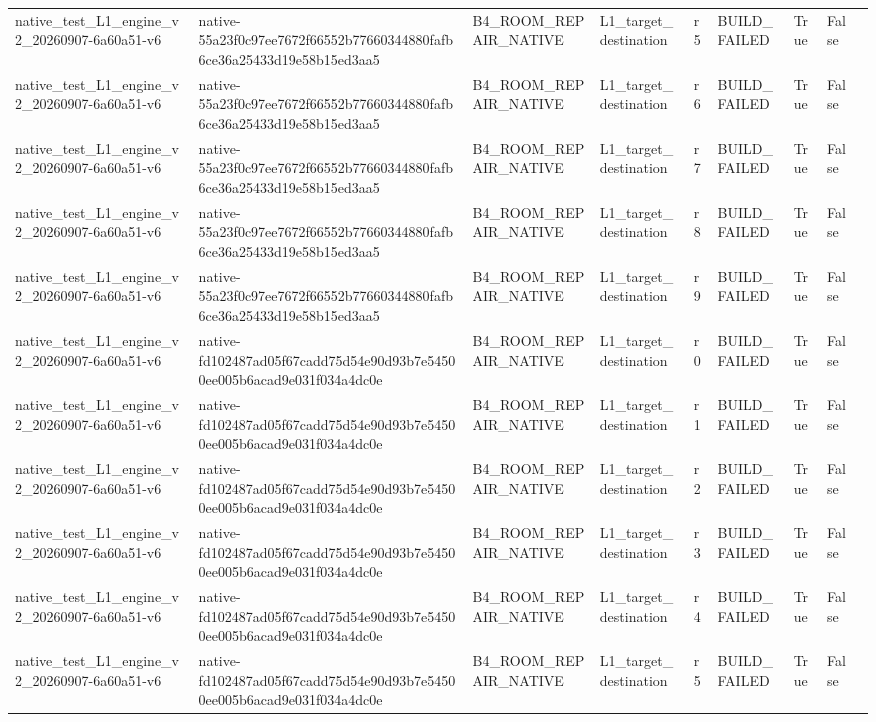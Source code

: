 \begin{tabular}{lllllllll}
native\_test\_L1\_engine\_v2\_20260907-6a60a51-v6 & native-55a23f0c97ee7672f66552b77660344880fafb6ce36a25433d19e58b15ed3aa5 & B4\_ROOM\_REPAIR\_NATIVE & L1\_target\_destination & r5 & BUILD\_FAILED & True & False &  \\
native\_test\_L1\_engine\_v2\_20260907-6a60a51-v6 & native-55a23f0c97ee7672f66552b77660344880fafb6ce36a25433d19e58b15ed3aa5 & B4\_ROOM\_REPAIR\_NATIVE & L1\_target\_destination & r6 & BUILD\_FAILED & True & False &  \\
native\_test\_L1\_engine\_v2\_20260907-6a60a51-v6 & native-55a23f0c97ee7672f66552b77660344880fafb6ce36a25433d19e58b15ed3aa5 & B4\_ROOM\_REPAIR\_NATIVE & L1\_target\_destination & r7 & BUILD\_FAILED & True & False &  \\
native\_test\_L1\_engine\_v2\_20260907-6a60a51-v6 & native-55a23f0c97ee7672f66552b77660344880fafb6ce36a25433d19e58b15ed3aa5 & B4\_ROOM\_REPAIR\_NATIVE & L1\_target\_destination & r8 & BUILD\_FAILED & True & False &  \\
native\_test\_L1\_engine\_v2\_20260907-6a60a51-v6 & native-55a23f0c97ee7672f66552b77660344880fafb6ce36a25433d19e58b15ed3aa5 & B4\_ROOM\_REPAIR\_NATIVE & L1\_target\_destination & r9 & BUILD\_FAILED & True & False &  \\
native\_test\_L1\_engine\_v2\_20260907-6a60a51-v6 & native-fd102487ad05f67cadd75d54e90d93b7e54500ee005b6acad9e031f034a4dc0e & B4\_ROOM\_REPAIR\_NATIVE & L1\_target\_destination & r0 & BUILD\_FAILED & True & False &  \\
native\_test\_L1\_engine\_v2\_20260907-6a60a51-v6 & native-fd102487ad05f67cadd75d54e90d93b7e54500ee005b6acad9e031f034a4dc0e & B4\_ROOM\_REPAIR\_NATIVE & L1\_target\_destination & r1 & BUILD\_FAILED & True & False &  \\
native\_test\_L1\_engine\_v2\_20260907-6a60a51-v6 & native-fd102487ad05f67cadd75d54e90d93b7e54500ee005b6acad9e031f034a4dc0e & B4\_ROOM\_REPAIR\_NATIVE & L1\_target\_destination & r2 & BUILD\_FAILED & True & False &  \\
native\_test\_L1\_engine\_v2\_20260907-6a60a51-v6 & native-fd102487ad05f67cadd75d54e90d93b7e54500ee005b6acad9e031f034a4dc0e & B4\_ROOM\_REPAIR\_NATIVE & L1\_target\_destination & r3 & BUILD\_FAILED & True & False &  \\
native\_test\_L1\_engine\_v2\_20260907-6a60a51-v6 & native-fd102487ad05f67cadd75d54e90d93b7e54500ee005b6acad9e031f034a4dc0e & B4\_ROOM\_REPAIR\_NATIVE & L1\_target\_destination & r4 & BUILD\_FAILED & True & False &  \\
native\_test\_L1\_engine\_v2\_20260907-6a60a51-v6 & native-fd102487ad05f67cadd75d54e90d93b7e54500ee005b6acad9e031f034a4dc0e & B4\_ROOM\_REPAIR\_NATIVE & L1\_target\_destination & r5 & BUILD\_FAILED & True & False &  \\

\end{tabular}
